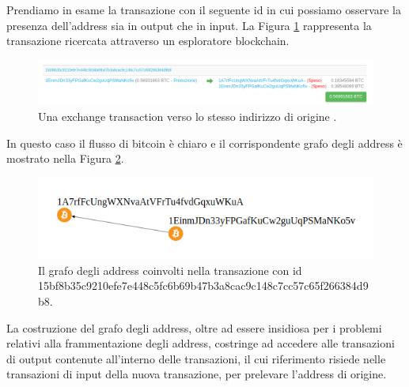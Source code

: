 \begin{example}\label{ex:sameaddr}

  Prendiamo in esame la transazione con il seguente id  in cui possiamo osservare la presenza dell’address  sia in output che in input.
  La Figura \ref{fig:exchangeaddressrecicle} rappresenta la transazione ricercata attraverso un esploratore blockchain.

\begin{figure}
\centering
  \includegraphics[scale=0.35]{images/exampleWithGraph/exchange-tx-with-same-address.png}
  \caption{Una exchange transaction verso lo stesso indirizzo di origine \cite{blockstream:esplora}.\label{fig:exchangeaddressrecicle}}
\end{figure}

  In questo caso il flusso di bitcoin è chiaro e il corrispondente grafo degli address è mostrato  nella Figura \ref{fig:graphAddresssameaddresschange}.

\begin{figure}[H]
\centering
  \includegraphics[scale=0.48]{images/exampleWithGraph/exchange-tx-with-same-address-graph.png}
  \caption{Il grafo degli address coinvolti nella transazione con id 15bf8\-b35c9210\-efe7e448c5fc\-6b69b47b3a\-8cac9c14\-8c7cc57c6\-5f26638\-4d9b8.\label{fig:graphAddresssameaddresschange}}
\end{figure}
\end{example}

La costruzione del grafo degli address, oltre ad essere insidiosa per i problemi relativi alla frammentazione degli address, costringe ad accedere alle transazioni di output contenute all’interno delle transazioni, il cui riferimento risiede nelle transazioni di input della nuova transazione, per prelevare l’address di origine.

